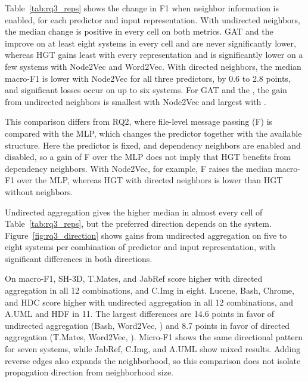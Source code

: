  Table~\ref{tab:rq3_reps} shows the change in F1 when neighbor information is enabled, for each predictor and input representation. With undirected neighbors, the median change is positive in every cell on both metrics. GAT and the \mlp{} improve on at least eight systems in every cell and are never significantly lower, whereas HGT gains least with every representation and is significantly lower on a few systems with Node2Vec and Word2Vec. With directed neighbors, the median macro-F1 is lower with Node2Vec for all three predictors, by 0.6 to 2.8 points, and significant losses occur on up to six systems. For GAT and the \mlp{}, the gain from undirected neighbors is smallest with Node2Vec and largest with \zs{}.

This comparison differs from RQ2, where file-level message passing (F) is compared with the MLP, which changes the predictor together with the available structure. Here the predictor is fixed, and dependency neighbors are enabled and disabled, so a gain of F over the MLP does not imply that HGT benefits from dependency neighbors. With Node2Vec, for example, F raises the median macro-F1 over the MLP, whereas HGT with directed neighbors is lower than HGT without neighbors.



 Undirected aggregation gives the higher median in almost every cell of Table~\ref{tab:rq3_reps}, but the preferred direction depends on the system. Figure~\ref{fig:rq3_direction} shows gains from undirected aggregation on five to eight systems per combination of predictor and input representation, with significant differences in both directions.

On macro-F1, SH-3D, T.Mates, and JabRef score higher with directed aggregation in all 12 combinations, and C.Img in eight. Lucene, Bash, Chrome, and HDC score higher with undirected aggregation in all 12 combinations, and A.UML and HDF in 11. The largest differences are 14.6 points in favor of undirected aggregation (Bash, Word2Vec, \mlp{}) and 8.7 points in favor of directed aggregation (T.Mates, Word2Vec, \mlp{}). Micro-F1 shows the same directional pattern for seven systems, while JabRef, C.Img, and A.UML show mixed results. Adding reverse edges also expands the neighborhood, so this comparison does not isolate propagation direction from neighborhood size.

